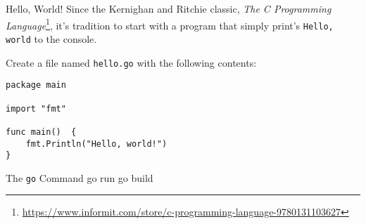 \documentclass[smaller]{beamer}
\begin{document}
\begin{frame}[label={sec:orge0cb31f},fragile]{Hello, World!}
 Since the Kernighan and Ritchie classic, \emph{The C Programming Language}\footnote{\url{https://www.informit.com/store/c-programming-language-9780131103627}}, it's tradition to start with a program that simply print's \texttt{Hello, world} to the console.

Create a file named \texttt{hello.go} with the following contents:

\lstset{language=go,label=orgd95d491,caption= ,captionpos=b,numbers=none}
\begin{lstlisting}
package main

import "fmt"

func main()  {
	fmt.Println("Hello, world!")
}
\end{lstlisting}
\end{frame}

\begin{frame}[label={sec:org62d2fd5},fragile]{The \texttt{go} Command}
 go run
go build
\end{frame}
\end{document}
